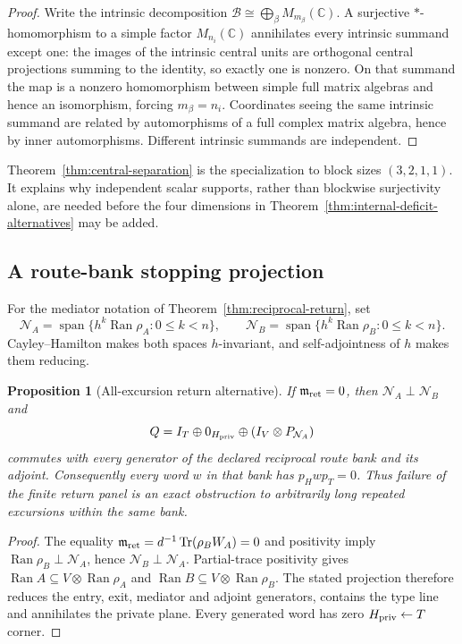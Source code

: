 \documentclass[11pt]{article}
\newtheorem{proposition}[theorem]{Proposition}
\theoremstyle{definition}
\theoremstyle{remark}
\newcommand{\C}{\mathbb C}
\newcommand{\Tr}{\operatorname{Tr}}
\newcommand{\Ran}{\operatorname{Ran}}
\newcommand{\Span}{\operatorname{span}}
\begin{document}
\begin{proof}
Write the intrinsic decomposition
$\mathcal B\cong\bigoplus_\beta M_{m_\beta}(\C)$.  A surjective
$*$-homomorphism to a simple factor $M_{n_i}(\C)$ annihilates every intrinsic
summand except one: the images of the intrinsic central units are orthogonal
central projections summing to the identity, so exactly one is nonzero.  On
that summand the map is a nonzero homomorphism between simple full matrix
algebras and hence an isomorphism, forcing $m_\beta=n_i$.  Coordinates seeing
the same intrinsic summand are related by automorphisms of a full complex
matrix algebra, hence by inner automorphisms.  Different intrinsic summands
are independent.
\end{proof}

Theorem~\ref{thm:central-separation} is the specialization to block sizes
$(3,2,1,1)$.  It explains why independent scalar supports, rather than
blockwise surjectivity alone, are needed before the four dimensions in
Theorem~\ref{thm:internal-deficit-alternatives} may be added.

\subsection{A route-bank stopping projection}

For the mediator notation of Theorem~\ref{thm:reciprocal-return}, set
\[
 \mathcal N_A=\Span\{h^k\Ran\rho_A:0\le k<n\},\qquad
 \mathcal N_B=\Span\{h^k\Ran\rho_B:0\le k<n\}.
\]
Cayley--Hamilton makes both spaces $h$-invariant, and self-adjointness of $h$
makes them reducing.

\begin{proposition}[All-excursion return alternative]
\label{prop:all-excursion-return}
If $\mathfrak m_{\rm ret}=0$, then
$\mathcal N_A\perp\mathcal N_B$ and
\[
 Q=I_T\oplus0_{H_{\rm priv}}\oplus(I_V\otimes P_{\mathcal N_A})
\]
commutes with every generator of the declared reciprocal route bank and its
adjoint.  Consequently every word $w$ in that bank has
$p_Hwp_T=0$.  Thus failure of the finite return panel is an exact obstruction
to arbitrarily long repeated excursions within the same bank.
\end{proposition}

\begin{proof}
The equality $\mathfrak m_{\rm ret}=d^{-1}\Tr(\rho_BW_A)=0$ and positivity
imply $\Ran\rho_B\perp\mathcal N_A$, hence
$\mathcal N_B\perp\mathcal N_A$.  Partial-trace positivity gives
$\Ran A\subseteq V\otimes\Ran\rho_A$ and
$\Ran B\subseteq V\otimes\Ran\rho_B$.  The stated projection therefore
reduces the entry, exit, mediator and adjoint generators, contains the type
line and annihilates the private plane.  Every generated word has zero
$H_{\rm priv}\leftarrow T$ corner.
\end{proof}
\end{document}
